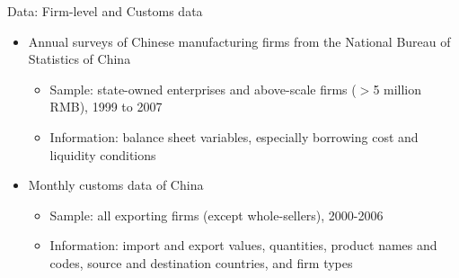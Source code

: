 \documentclass[10pt]{beamer}
\begin{document}
\begin{frame}{Data: Firm-level and Customs data}
    \begin{itemize}
	\item Annual surveys of Chinese manufacturing firms from the National Bureau of Statistics of China
	\begin{itemize}
		\item Sample: state-owned enterprises and above-scale firms ($>$5 million RMB), 1999 to 2007 
            \item Information: balance sheet variables, especially borrowing cost and liquidity conditions
	\end{itemize}
        \medskip
        \item Monthly customs data of China
        \begin{itemize}
            \item Sample: all exporting firms (except whole-sellers), 2000-2006
            \item Information: import and export values, quantities, product names and codes, source and destination countries, and firm types
	\end{itemize}
         
    \end{itemize}
\end{frame}
\end{document}

